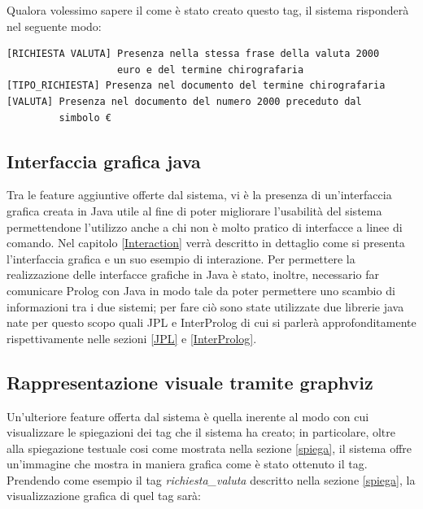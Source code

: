 Qualora volessimo sapere il come è stato creato questo tag, il sistema risponderà nel seguente modo:

\begin{verbatim}
[RICHIESTA VALUTA] Presenza nella stessa frase della valuta 2000
                   euro e del termine chirografaria
[TIPO_RICHIESTA] Presenza nel documento del termine chirografaria
[VALUTA] Presenza nel documento del numero 2000 preceduto dal 
         simbolo €
\end{verbatim}
\subsection{Interfaccia grafica java}
Tra le feature aggiuntive offerte dal sistema, vi è la presenza di un'interfaccia grafica creata in Java utile al fine di poter migliorare l'usabilità del sistema permettendone l'utilizzo anche a chi non è molto pratico di interfacce a linee di comando. Nel capitolo \ref{Interaction} verrà descritto in dettaglio come si presenta l'interfaccia grafica e un suo esempio di interazione. 
Per permettere la realizzazione delle interfacce grafiche in Java è stato, inoltre, necessario far comunicare Prolog con Java in modo tale da poter permettere uno scambio di informazioni tra i due sistemi; per fare ciò sono state utilizzate due librerie java nate per questo scopo quali JPL e InterProlog di cui si parlerà approfonditamente rispettivamente nelle sezioni \ref{JPL} e \ref{InterProlog}.
\subsection{Rappresentazione visuale tramite graphviz}
\nocite{gansner2006drawing}
\nocite{wiki:Graphviz}
Un'ulteriore feature offerta dal sistema è quella inerente al modo con cui visualizzare le spiegazioni dei tag che il sistema ha creato; in particolare, oltre alla spiegazione testuale cosi come mostrata nella sezione \ref{spiega}, il sistema offre un'immagine che mostra in maniera grafica come è stato ottenuto il tag.
Prendendo come esempio il tag \emph{richiesta\_valuta} descritto nella sezione \ref{spiega}, la visualizzazione grafica di quel tag sarà:

